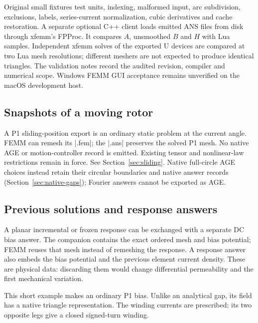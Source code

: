 Original small fixtures test units, indexing, malformed input, arc subdivision,
exclusions, labels, series-current normalization, cubic derivatives and cache
restoration. A separate optional C++ client loads emitted ANS files from disk
through xfemm's FPProc. It compares $A$, unsmoothed $B$ and $H$ with Lua samples.
Independent xfemm solves of the exported U devices are compared at two Lua mesh
resolutions; different meshers are not expected to produce identical triangles.
The validation notes record the audited revision, compiler and numerical scope.
Windows FEMM GUI acceptance remains unverified on the macOS development host.

\subsection{Snapshots of a moving rotor}
A P1 sliding-position export is an ordinary static problem at the current angle.
FEMM can remesh its |.fem|; the |.ans| preserves the solved P1 mesh. No native AGE
or motion-controller record is emitted. Existing tensor and nonlinear-law
restrictions remain in force. See Section~\ref{sec:sliding}. Native full-circle
AGE choices instead retain their circular boundaries and native answer records
(Section~\ref{sec:native-gaps}); Fourier answers cannot be exported as AGE.

\subsection{Previous solutions and response answers}
\label{sec:response-exchange}

A planar incremental or frozen response can be exchanged with a separate DC
bias answer. The companion contains the exact ordered mesh and bias potential;
FEMM reuses that mesh instead of remeshing the response. A response answer also
embeds the bias potential and the previous element current density. These are
physical data: discarding them would change differential permeability and the
first mechanical variation.

This short example makes an ordinary P1 bias. Unlike an analytical gap, its
field has a native triangle representation. The winding currents are
prescribed; its two opposite legs give a closed signed-turn winding.

\begin{codeexample}[width=5cm]
\end{codeexample}

